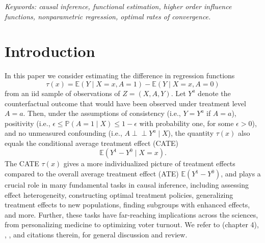\documentclass[11pt,twoside]{article}
\def\ind{\perp\!\!\!\perp}
\newcommand{\Pb}{\mathbb{P}}
\newcommand{\E}{\mathbb{E}}
\theoremstyle{definition}
\theoremstyle{remark}
\begin{document}
\bigskip

\noindent
{\it Keywords: causal inference, functional estimation, higher order influence functions, nonparametric regression, optimal rates of convergence.} 

\pagebreak

\section{Introduction}


In this paper we consider estimating the difference in regression functions
\begin{equation}
\tau(x) = \E(Y \mid X=x, A=1) - \E(Y \mid X=x, A=0)
\end{equation}
from an iid sample of observations of $Z=(X,A,Y)$. Let $Y^a$ denote the counterfactual outcome that would have been observed under treatment level $A=a$. 
Then, under the assumptions of consistency (i.e., $Y=Y^a$ if $A=a$), positivity (i.e., $\epsilon \leq \Pb(A = 1 \mid X) \leq 1-\epsilon$ with probability one, for some $\epsilon>0$), and no unmeasured confounding (i.e., $A \ind Y^a \mid X$), the quantity $\tau(x)$ also equals the conditional average treatment effect (CATE)
$$ \E(Y^1 - Y^0 \mid X=x) . $$ 
The CATE $\tau(x)$ gives a more individualized picture of treatment effects compared to the overall average treatment effect (ATE) $\E(Y^1-Y^0)$, and plays a crucial role in many fundamental tasks in causal inference, including assessing effect heterogeneity, constructing optimal treatment policies, generalizing treatment effects to new populations, finding subgroups with enhanced effects, and more. Further, these tasks have far-reaching implications across the sciences, from personalizing medicine to optimizing voter turnout. We refer to  \citet{hernan2020causal} (chapter 4), \citet{nie2017quasi}, \citet{kennedy2023towards}, and citations therein, for general discussion and review. \\
\end{document}
